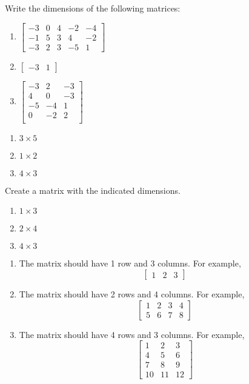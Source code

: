 \begin{Exercise}[title = {Matrix Dimensions 1}, label = mat_dim1]
Write the dimensions of the following matrices:
\begin{enumerate}
\item $\begin{bmatrix}
-3 & 0 & 4 & -2 & -4\\
-1 & 5 & 3 & 4 & -2\\
-3 & 2 & 3 & -5 & 1
\end{bmatrix}$
\item $\begin{bmatrix}
-3 & 1
\end{bmatrix}$
\item $\begin{bmatrix}
-3 & 2 & -3\\
4 & 0 & -3\\
-5 & -4 & 1\\
0 & -2 & 2\\
\end{bmatrix}$
\end{enumerate}
\end{Exercise}

\begin{Answer}[ref = mat_dim1]
\begin{enumerate}
\item $3 \times 5$
\item $1 \times 2$
\item $4 \times 3$
\end{enumerate}
\end{Answer}

\begin{Exercise}[title = {Matrix Dimensions 2}, label = mat_dim2]
Create a matrix with the indicated dimensions.
\begin{enumerate}
\item $1 \times 3$
\item $2 \times 4$
\item $4 \times 3$
\end{enumerate}
\end{Exercise}

\begin{Answer}[ref = mat_dim2]
\begin{enumerate}
\item The matrix should have 1 row and 3 columns. For example,
$$\begin{bmatrix}
1 & 2 & 3
\end{bmatrix}$$
\item The matrix should have 2 rows and 4 columns. For example,
$$\begin{bmatrix}
1 & 2 & 3 & 4\\
5 & 6 & 7 & 8
\end{bmatrix}$$
\item The matrix should have 4 rows and 3 columns. For example,
$$\begin{bmatrix}
1 & 2 & 3\\
4 & 5 & 6\\
7& 8 & 9\\
10 & 11 & 12
\end{bmatrix}$$
\end{enumerate}
\end{Answer}

